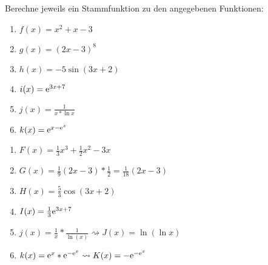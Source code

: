 


 Berechne jeweils ein Stammfunktion zu den angegebenen Funktionen:
\begin{multicols}{3}
	\begin{enumerate}
		\item $f(x)=x^2+x-3$
		\item $g(x)=(2x-3)^8$
		\item $h(x)=-5\sin(3x+2)$
		\item $i(x)=\mathrm{e}^{3x+7}$
		\item $j(x)=\frac{1}{x*\ln x}$
		\item $k(x)=\mathrm{e}^{x-\mathrm{e}^x}$
	\end{enumerate}
\end{multicols}
\begin{lsg}{}
	\begin{multicols}{2}
		\begin{enumerate}
			\item $F(x)=\frac 1 3x^3+\frac 1 2 x^2-3x$
			\item $G(x)=\frac 1 9 (2x-3)*\frac 1 2=\frac{1}{18}(2x-3)$
			\item $H(x)=\frac 5 3 \cos(3x+2)$
			\item $I(x)=\frac 1 3 \mathrm{e}^{3x+7}$
			\item $j(x)=\frac 1 x*\frac{1}{\ln(x)}\rightsquigarrow J(x)=\ln(\ln x)$
			\item $k(x)=\mathrm{e}^x*\mathrm{e}^{-\mathrm{e}^x}\rightsquigarrow K(x)=-\mathrm{e}^{-\mathrm{e}^x}$
		\end{enumerate}
	\end{multicols}
\end{lsg}




